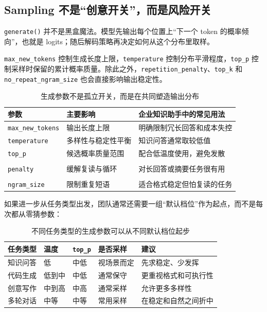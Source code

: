 \subsection{Sampling 不是“创意开关”，而是风险开关}
\texttt{generate()} 并不是黑盒魔法。模型先输出每个位置上“下一个 token 的概率倾向”，也就是 logits；随后解码策略再决定如何从这个分布里取样。

\texttt{max\_new\_tokens} 控制生成长度上限，\texttt{temperature} 控制分布平滑程度，\texttt{top\_p} 控制采样时保留的累计概率质量。除此之外，\texttt{repetition\_penalty}、\texttt{top\_k} 和 \texttt{no\_repeat\_ngram\_size} 也会直接影响输出稳定性。

\begin{table}[H]
\centering
\small
\begin{tabularx}{\textwidth}{>{\raggedright\arraybackslash}p{3cm}>{\raggedright\arraybackslash}p{3.3cm}>{\raggedright\arraybackslash}X}
\toprule
\textbf{参数} & \textbf{主要影响} & \textbf{企业知识助手中的常见用法} \\
\midrule
\texttt{max\_new\_tokens} & 输出长度上限 & 明确限制冗长回答和成本失控 \\
\texttt{temperature} & 多样性与稳定性平衡 & 知识问答通常取较低值 \\
\texttt{top\_p} & 候选概率质量范围 & 配合低温度使用，避免发散 \\
\makecell[l]{\texttt{repetition\_}\\\texttt{penalty}} & 缓解复读与循环 & 对长回答或摘要任务很有用 \\
\makecell[l]{\texttt{no\_repeat\_}\\\texttt{ngram\_size}} & 限制重复短语 & 适合格式稳定但怕复读的任务 \\
\bottomrule
\end{tabularx}
\caption{生成参数不是孤立开关，而是在共同塑造输出分布}
\label{tab:generation-params}
\end{table}

如果进一步从任务类型出发，团队通常还需要一组“默认档位”作为起点，而不是每次都从零猜参数：

\begin{table}[H]
\centering
\small
\begin{tabularx}{\textwidth}{>{\raggedright\arraybackslash}p{2.8cm}>{\raggedright\arraybackslash}p{2.4cm}>{\raggedright\arraybackslash}p{2.4cm}>{\raggedright\arraybackslash}p{2.2cm}>{\raggedright\arraybackslash}X}
\toprule
\textbf{任务类型} & \textbf{温度} & \textbf{\texttt{top\_p}} & \textbf{是否采样} & \textbf{建议} \\
\midrule
知识问答 & 低 & 中低 & 视场景而定 & 先求稳定、少发挥 \\
代码生成 & 低到中 & 中低 & 通常保守 & 更重视格式和可执行性 \\
创意写作 & 中到高 & 中高 & 通常采样 & 允许更多多样性 \\
多轮对话 & 中等 & 中等 & 常用采样 & 在稳定和自然之间折中 \\
\bottomrule
\end{tabularx}
\caption{不同任务类型的生成参数可以从不同默认档位起步}
\label{tab:task-generation-defaults}
\end{table}

